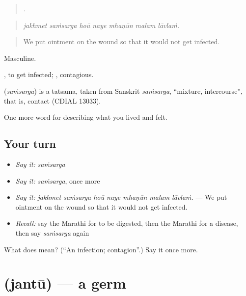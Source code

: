 \begin{quote}
      .
\end{quote}

\begin{quote}
\emph{jakhmet saṁsarga hoū naye mhaṇūn malam lāvlaṁ.}
\end{quote}

\begin{quote}
We put ointment on the wound so that it would not get infected.
\end{quote}

Masculine.

 , to get infected; , contagious.

\begin{cousinweb}
\textbf{} (\emph{saṁsarga}) is a tatsama, taken from Sanskrit \emph{saṁsarga}, \textquotedblleft{}mixture, intercourse\textquotedblright{}, that is, contact (CDIAL 13033).
\end{cousinweb}

\begin{grammarlens}[title={What you've built}]
One more word for describing what you lived and felt.
\end{grammarlens}

\subsection*{Your turn}
\begin{itemize}
\raggedright
  \item \emph{Say it:} \emph{saṁsarga}
  \item \emph{Say it:} \emph{saṁsarga}, once more
  \item \emph{Say it:} \emph{jakhmet saṁsarga hoū naye mhaṇūn malam lāvlaṁ.} — We put ointment on the wound so that it would not get infected.
  \item \emph{Recall:} say the Marathi for to be digested, then the Marathi for a disease, then say \emph{saṁsarga} again
\end{itemize}

\begin{tcolorbox}[breakable,colback=teal!4,colframe=teal!35!black,title={Before you move on}]
What does  mean? (\textquotedblleft{}An infection; contagion\textquotedblright{}.) Say it once more.
\end{tcolorbox}
\section[\texorpdfstring{\mr{जंतू} (jantū)}{जंतू (jantū)}]{ (jantū) — a germ}

